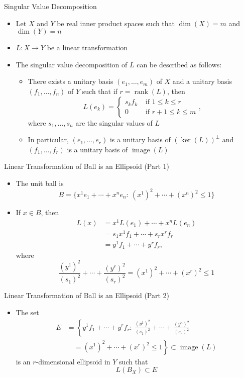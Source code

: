 \documentclass[usenames,dvipsnames,10pt]{beamer}
\newcommand\rank{\operatorname{rank}}
\newcommand\image{\operatorname{image}}
\begin{document}
\begin{frame}
  {Singular Value Decomposition}

  \begin{itemize}
  \item Let $X$ and $Y$ be real inner product spaces such that $\dim(X) = m$ and $\dim(Y) = n$
  \item $L: X \rightarrow Y$ be a linear transformation
  \item The singular value decomposition of $L$ can be described as follows:
    \begin{itemize}
    \item There exists a unitary basis $(e_1, \dots, e_m)$ of $X$ and a unitary basis $(f_1, \dots, f_n)$  of $Y$ such that if $r = \rank(L)$, then
      \[
        L(e_k) =
        \begin{cases}
          s_kf_k &\text{ if }1 \le k \le r\\
          0 &\text{ if }r+1 \le k \le m
        \end{cases},
      \]
      where $s_1, \dots, s_n$ are the singular values of $L$
    \item In particular, $(e_1, \dots, e_r)$ is a unitary basis of $(\ker(L))^\perp$ and $(f_1, \dots, f_r)$ is a unitary basis of $\image(L)$
    \end{itemize}
  \end{itemize}
\end{frame}

\begin{frame}
  {Linear Transformation of Ball is an Ellipsoid (Part 1)}

  \begin{itemize}
  \item The unit ball is
    \[ B = \{ x^1e_1+\cdots+x^ne_n: \ (x^1)^2 + \cdots + (x^n)^2 \le 1\} \]
  \item If $x \in B$, then
    \begin{align*}
      L(x) &= x^1L(e_1) + \cdots + x^nL(e_n)\\
           &= s_1x^1 f_1 + \cdots + s_rx^rf_r\\
           &= y^1f_1 + \cdots + y^rf_r,
    \end{align*}
    where
    \[ \frac{(y^1)^2}{(s_1)^2} + \cdots + \frac{(y^r)^2}{(s_r)^2} = (x^1)^2 + \cdots + (x^r)^2 \le 1 \]
  \end{itemize}
\end{frame}

\begin{frame}
  {Linear Transformation of Ball is an Ellipsoid (Part 2)}

  \begin{itemize}
  \item The set
    \begin{align*}
      E &= \left\{ y^1f_1 + \cdots + y^rf_r:\ \frac{(y^1)^2}{(s_1)^2} + \cdots + \frac{(y^n)^2}{(s_r)^2}\right.\\
        &\quad= \left.(x^1)^2 + \cdots + (x^r)^2 \le 1 \right\} \subset \image(L)
    \end{align*}
    is an $r$-dimensional ellipsoid in $Y$ such that
    \[ L(B_X) \subset E \]
  \end{itemize}
\end{frame}
\end{document}
